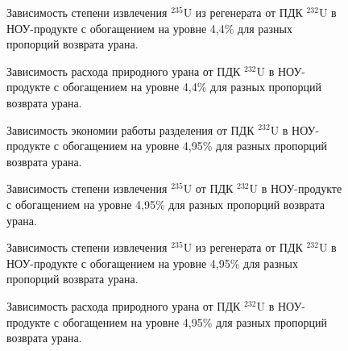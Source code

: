 \begin{figure}
    \centering
    \begin{minipage}{.5\textwidth}
      \centering
      
\caption{{Зависимость степени извлечения $^{235}$U из регенерата от ПДК $^{232}$U в НОУ-продукте с обогащением на уровне 4,4\% для разных пропорций возврата урана.{\label{exR44}}}}
    \end{minipage}%
    \begin{minipage}{.5\textwidth}
      \centering
      
\caption{{Зависимость расхода природного урана от ПДК $^{232}$U в НОУ-продукте с обогащением на уровне 4,4\% для разных пропорций возврата урана.{\label{F0R44}}}}
    \end{minipage}
\end{figure}


\begin{figure}
    \centering
    \begin{minipage}{.5\textwidth}
      \centering
      
\caption{{Зависимость экономии работы разделения от ПДК $^{232}$U в НОУ-продукте с обогащением на уровне 4,95\% для разных пропорций возврата урана.{\label{sw495}}}}
    \end{minipage}%
    \begin{minipage}{.5\textwidth}
      \centering
      
\caption{{Зависимость степени извлечения $^{235}$U от ПДК $^{232}$U в НОУ-продукте с обогащением на уровне 4,95\% для разных пропорций возврата урана.{\label{ex495}}}}
\end{minipage}
\end{figure}

\begin{figure}
    \centering
    \begin{minipage}{.5\textwidth}
      \centering
      
\caption{{Зависимость степени извлечения $^{235}$U из регенерата от ПДК $^{232}$U в НОУ-продукте с обогащением на уровне 4,95\% для разных пропорций возврата урана.{\label{exR495}}}}
    \end{minipage}%
    \begin{minipage}{.5\textwidth}
      \centering
      
\caption{{Зависимость расхода природного урана от ПДК $^{232}$U в НОУ-продукте с обогащением на уровне 4,95\% для разных пропорций возврата урана.{\label{F0R495}}}}
\end{minipage}
\end{figure}


